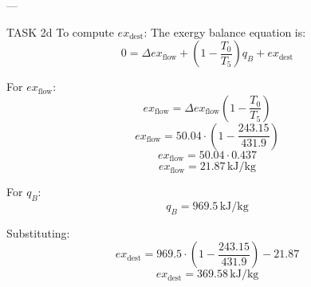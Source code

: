 ---

TASK 2d  
To compute \( ex_{\text{dest}} \):  
The exergy balance equation is:  
\[
0 = \Delta ex_{\text{flow}} + \left( 1 - \frac{T_0}{T_5} \right) q_B + ex_{\text{dest}}
\]  

For \( ex_{\text{flow}} \):  
\[
ex_{\text{flow}} = \Delta ex_{\text{flow}} \left( 1 - \frac{T_0}{T_5} \right)
\]  
\[
ex_{\text{flow}} = 50.04 \cdot \left( 1 - \frac{243.15}{431.9} \right)
\]  
\[
ex_{\text{flow}} = 50.04 \cdot 0.437
\]  
\[
ex_{\text{flow}} = 21.87 \, \text{kJ}/\text{kg}
\]  

For \( q_B \):  
\[
q_B = 969.5 \, \text{kJ}/\text{kg}
\]  

Substituting:  
\[
ex_{\text{dest}} = 969.5 \cdot \left( 1 - \frac{243.15}{431.9} \right) - 21.87
\]  
\[
ex_{\text{dest}} = 369.58 \, \text{kJ}/\text{kg}
\]